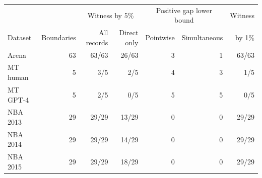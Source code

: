 \begin{tabular}{lrrrrrr}\toprule & & \multicolumn{2}{c}{Witness by 5\%} & \multicolumn{2}{c}{Positive gap lower bound} & Witness \\ Dataset & Boundaries & All records & Direct only & Pointwise & Simultaneous & by 1\% \\ \midrule
Arena & 63 & 63/63 & 26/63 & 3 & 1 & 63/63 \\
MT human & 5 & 3/5 & 2/5 & 4 & 3 & 1/5 \\
MT GPT-4 & 5 & 2/5 & 0/5 & 5 & 5 & 0/5 \\
NBA 2013 & 29 & 29/29 & 13/29 & 0 & 0 & 29/29 \\
NBA 2014 & 29 & 29/29 & 14/29 & 0 & 0 & 29/29 \\
NBA 2015 & 29 & 29/29 & 18/29 & 0 & 0 & 29/29 \\
\bottomrule
\end{tabular}
